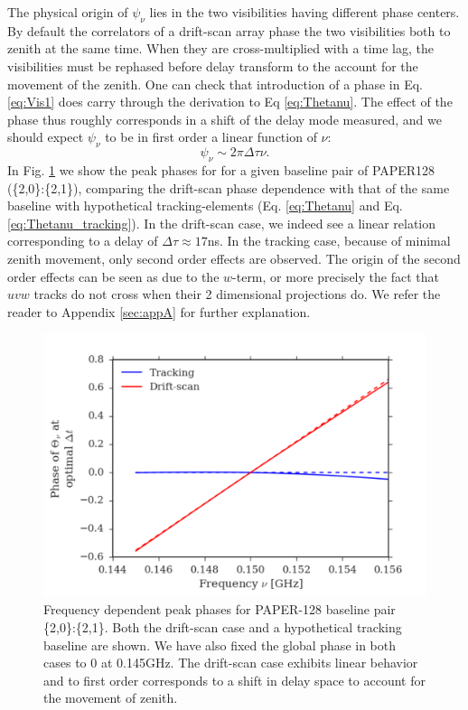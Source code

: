 \documentclass[twocolumn,apj,numberedappendix]{emulateapj}
\renewcommand\[{\begin{equation}}
\renewcommand\]{\end{equation}}
\begin{document}
The physical origin of $\psi_\nu$ lies in the two visibilities having different phase centers. By default the correlators of a drift-scan array phase the two visibilities both to zenith at the same time. When they are cross-multiplied with a time lag, the visibilities must be rephased before delay transform to the account for the movement of the zenith. One can check that introduction of a phase in Eq. \ref{eq:Vis1} does carry through the derivation to Eq \ref{eq:Thetanu}. The effect of the phase thus roughly corresponds in a shift of the delay mode measured, and we should expect $\psi_{\nu}$ to be in first order a linear function of $\nu$:
\[
\psi_{\nu}\sim 2\pi\Delta\tau\nu.
\]
In Fig. \ref{fig:phi_nu} we show the peak phases for for a given baseline pair of PAPER128 (\{2,0\}:\{2,1\}), comparing the drift-scan phase dependence with that of the same baseline with hypothetical tracking-elements (Eq. \ref{eq:Thetanu} and Eq. \ref{eq:Thetanu_tracking}). In the drift-scan case, we indeed see a linear relation corresponding to a delay of $\Delta\tau\approx17$ns. In the tracking case, because of minimal zenith movement, only second order effects are observed. The origin of the second order effects can be seen as due to the $w$-term, or more precisely the fact that $uvw$ tracks do not cross when their 2 dimensional projections do. We refer the reader to Appendix \ref{sec:appA} for further explanation. 

\begin{figure}[H]
\includegraphics[width=1\linewidth]{phi_nu}

\caption{Frequency dependent peak phases for PAPER-128 baseline pair \{2,0\}:\{2,1\}. Both the drift-scan case and a hypothetical tracking baseline are shown. We have also fixed the global phase in both cases to 0 at 0.145GHz. The drift-scan case exhibits linear behavior and to first order corresponds to a shift in delay space to account for the movement of zenith. }
\label{fig:phi_nu}
\end{figure}
\end{document}
